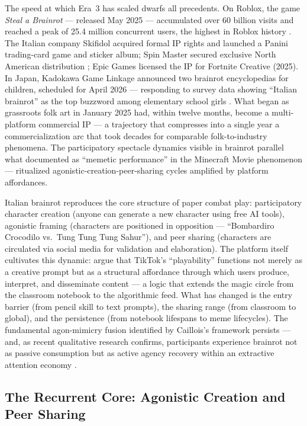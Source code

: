 \documentclass[12pt]{article}
\begin{document}
The speed at which Era~3 has scaled dwarfs all precedents. On Roblox, the game \emph{Steal a Brainrot} --- released May 2025 --- accumulated over 60 billion visits and reached a peak of 25.4 million concurrent users, the highest in Roblox history \citep{pocketgamer2025}. The Italian company Skifidol acquired formal IP rights and launched a Panini trading-card game and sticker album; Spin Master secured exclusive North American distribution \citep{licenseglobal2026}; Epic Games licensed the IP for Fortnite Creative (2025). In Japan, Kadokawa Game Linkage announced two brainrot encyclopedias for children, scheduled for April 2026 --- responding to survey data showing ``Italian brainrot'' as the top buzzword among elementary school girls \citep{automaton2026}. What began as grassroots folk art in January 2025 had, within twelve months, become a multi-platform commercial IP --- a trajectory that compresses into a single year a commercialization arc that took decades for comparable folk-to-industry phenomena. The participatory spectacle dynamics visible in brainrot parallel what \citet{melo2026} documented as ``memetic performance'' in the Minecraft Movie phenomenon --- ritualized agonistic-creation-peer-sharing cycles amplified by platform affordances.

Italian brainrot reproduces the core structure of paper combat play: participatory character creation (anyone can generate a new character using free AI tools), agonistic framing (characters are positioned in opposition --- ``Bombardiro Crocodilo vs.\ Tung Tung Tung Sahur''), and peer sharing (characters are circulated via social media for validation and elaboration). The platform itself cultivates this dynamic: \citet{divon2025} argue that TikTok's ``playability'' functions not merely as a creative prompt but as a structural affordance through which users produce, interpret, and disseminate content --- a logic that extends the magic circle from the classroom notebook to the algorithmic feed. What has changed is the entry barrier (from pencil skill to text prompts), the sharing range (from classroom to global), and the persistence (from notebook lifespans to meme lifecycles). The fundamental agon-mimicry fusion identified by Caillois's framework persists --- and, as recent qualitative research confirms, participants experience brainrot not as passive consumption but as active agency recovery within an extractive attention economy \citep{gotzfried2026}.

\subsection{The Recurrent Core: Agonistic Creation and Peer Sharing}
\end{document}
